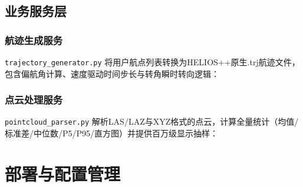 \documentclass[a4paper,fleqn]{cas-sc}
\begin{document}


\subsection{业务服务层}

\subsubsection{航迹生成服务}
\texttt{trajectory\_generator.py} 将用户航点列表转换为HELIOS++原生.trj航迹文件，包含偏航角计算、速度驱动时间步长与转角瞬时转向逻辑：



\subsubsection{点云处理服务}
\texttt{pointcloud\_parser.py} 解析LAS/LAZ与XYZ格式的点云，计算全量统计（均值/标准差/中位数/P5/P95/直方图）并提供百万级显示抽样：



\newpage


\newpage
\appendix

\section{部署与配置管理}
\end{document}
